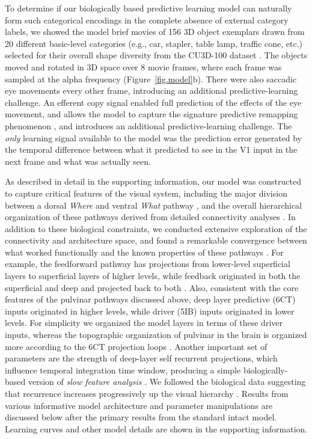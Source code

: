 \documentclass[11pt,twoside]{article}
\newif\myifpdf
\begin{document}
To determine if our biologically based predictive learning model can naturally form such categorical encodings in the complete absence of external category labels, we showed the model brief movies of 156 3D object exemplars drawn from 20 different basic-level categories (e.g., car, stapler, table lamp, traffic cone, etc.) selected for their overall shape diversity from the CU3D-100 dataset \cite{OReillyWyatteHerdEtAl13}.  The objects moved and rotated in 3D space over 8 movie frames, where each frame was sampled at the alpha frequency (Figure~\ref{fig.model}b).  There were also saccadic eye movements every other frame, introducing an additional predictive-learning challenge.  An efferent copy signal enabled full prediction of the effects of the eye movement, and allows the model to capture the signature predictive remapping phenomenon \cite{DuhamelColbyGoldberg92,CavanaghHuntAfrazEtAl10}, and introduces an additional predictive-learning challenge.  The \emph{only} learning signal available to the model was the prediction error generated by the temporal difference between what it predicted to see in the V1 input in the next frame and what was actually seen.

As described in detail in the supporting information, our model was constructed to capture critical features of the visual system, including the major division between a dorsal \emph{Where} and ventral \emph{What} pathway \cite{UngerleiderMishkin82}, and the overall hierarchical organization of these pathways derived from detailed connectivity analyses \cite{RocklandPandya79,FellemanVanEssen91,MarkovVezoliChameauEtAl14,MarkovErcsey-RavaszGomesEtAl14}.  In addition to these biological constraints, we conducted extensive exploration of the connectivity and architecture space, and found a remarkable convergence between what worked functionally and the known properties of these pathways \cite{OReillyWyatteRohrlich17}.  For example, the feedforward pathway has projections from lower-level superficial layers to superficial layers of higher levels, while feedback originated in both the superficial and deep and projected back to both \cite{RocklandPandya79,FellemanVanEssen91}.  Also, consistent with the core features of the pulvinar pathways discussed above, deep layer predictive (6CT) inputs originated in higher levels, while driver (5IB) inputs originated in lower levels.  For simplicity we organized the model layers in terms of these driver inputs, whereas the topographic organization of pulvinar in the brain is organized more according to the 6CT projection loops \cite{Shipp03}.  Another important set of parameters are the strength of deep-layer self recurrent projections, which influence temporal integration time window, producing a simple biologically-based version of \emph{slow feature analysis} \cite{WiskottSejnowski02,Foldiak91}.  We followed the biological data suggesting that recurrence increases progressively up the visual hierarchy \cite{ChaudhuriKnoblauchGarielEtAl15}.  Results from various informative model architecture and parameter manipulations are discussed below after the primary results from the standard intact model.  Learning curves and other model details are shown in the supporting information.
\end{document}
